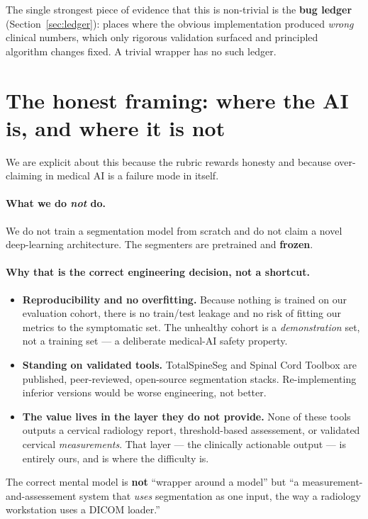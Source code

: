 \documentclass[11pt]{article}
\begin{document}
The single strongest piece of evidence that this is non-trivial is the \textbf{bug ledger}
(Section~\ref{sec:ledger}): places where the obvious implementation produced \emph{wrong} clinical
numbers, which only rigorous validation surfaced and principled algorithm changes fixed. A trivial
wrapper has no such ledger.

\section{The honest framing: where the AI is, and where it is not}
We are explicit about this because the rubric rewards honesty and because over-claiming in medical AI is
a failure mode in itself.

\paragraph{What we do \emph{not} do.} We do not train a segmentation model from scratch and do not claim
a novel deep-learning architecture. The segmenters are pretrained and \textbf{frozen}.

\paragraph{Why that is the correct engineering decision, not a shortcut.}
\begin{itemize}
  \item \textbf{Reproducibility and no overfitting.} Because nothing is trained on our evaluation
  cohort, there is no train/test leakage and no risk of fitting our metrics to the symptomatic set. The
  unhealthy cohort is a \emph{demonstration} set, not a training set --- a deliberate medical-AI safety
  property.
  \item \textbf{Standing on validated tools.} TotalSpineSeg and Spinal Cord Toolbox are published,
  peer-reviewed, open-source segmentation stacks. Re-implementing inferior versions would be worse
  engineering, not better.
  \item \textbf{The value lives in the layer they do not provide.} None of these tools outputs a
  cervical radiology report, threshold-based assessement, or validated cervical \emph{measurements}.
  That layer --- the clinically actionable output --- is entirely ours, and is where the difficulty is.
\end{itemize}

The correct mental model is \textbf{not} ``wrapper around a model'' but ``a
measurement-and-assessement system that \emph{uses} segmentation as one input, the way a radiology
workstation uses a DICOM loader.''
\end{document}
